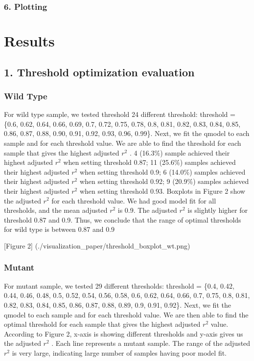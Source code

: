\documentclass[10pt,letterpaper]{article}
\begin{document}
\subsubsection{6. Plotting}\label{plotting}

\section{Results}\label{results}

\subsection{1. Threshold optimization
evaluation}\label{threshold-optimization-evaluation}

\subsubsection{Wild Type}\label{wild-type}

For wild type sample, we tested threshold 24 different threshold:
threshold = \{0.6, 0.62, 0.64, 0.66, 0.69, 0.7, 0.72, 0.75, 0.78, 0.8,
0.81, 0.82, 0.83, 0.84, 0.85, 0.86, 0.87, 0.88, 0.90, 0.91, 0.92, 0.93,
0.96, 0.99\}. Next, we fit the qmodel to each sample and for each
threshold value. We are able to find the threshold for each sample that
gives the highest adjusted \(r^2\) . 4 (16.3\%) sample achieved their
highest adjusted \(r^2\) when setting threshold 0.87; 11 (25.6\%)
samples achieved their highest adjusted \(r^2\) when setting threshold
0.9; 6 (14.0\%) samples achieved their highest adjusted \(r^2\) when
setting threshold 0.92; 9 (20.9\%) samples achieved their highest
adjusted \(r^2\) when setting threshold 0.93. Boxplots in Figure 2 show
the adjusted \(r^2\) for each threshold value. We had good model fit for
all thresholds, and the mean adjusted \(r^2\) is 0.9. The adjusted
\(r^2\) is slightly higher for threshold 0.87 and 0.9. Thus, we conclude
that the range of optimal thresholds for wild type is between 0.87 and
0.9

{[}Figure 2{]} (./visualization\_paper/threshold\_boxplot\_wt.png)

\subsubsection{Mutant}\label{mutant}

For mutant sample, we tested 29 different thresholds: threshold = \{0.4,
0.42, 0.44, 0.46, 0.48, 0.5, 0.52, 0.54, 0.56, 0.58, 0.6, 0.62, 0.64,
0.66, 0.7, 0.75, 0.8, 0.81, 0.82, 0.83, 0.84, 0.85, 0.86, 0.87, 0.88,
0.89, 0.9, 0.91, 0.92\}. Next, we fit the qmodel to each sample and for
each threshold value. We are then able to find the optimal threshold for
each sample that gives the highest adjusted \(r^2\) value. According to
Figure 2, x-axis is showing different thresholds and y-axis gives us the
adjusted \(r^2\) . Each line represents a mutant sample. The range of
the adjusted \(r^2\) is very large, indicating large number of samples
having poor model fit.
\end{document}
